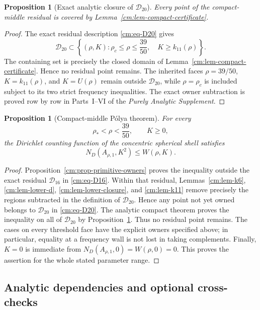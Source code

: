 \documentclass[11pt]{article}
\numberwithin{equation}{section}
\newtheorem{proposition}[theorem]{Proposition}
\theoremstyle{definition}
\theoremstyle{remark}
\begin{document}
\begin{proposition}[Exact analytic closure of \(\mathcal D_{20}\)]
\label{cm:prop-exact-closure}
Every point of the compact-middle residual is covered by
Lemma~\ref{cm:lem-compact-certificate}.
\end{proposition}

\begin{proof}
The exact residual description \eqref{cm:eq-D20} gives
\[
 \mathcal D_{20}
 \subset
 \left\{(\rho,K):
 \rho_c\leq\rho\leq\frac{39}{50},\quad
 K\geq k_{11}(\rho)\right\}.
\]
The containing set is precisely the closed domain of
Lemma~\ref{cm:lem-compact-certificate}.  Hence no residual point remains.
The inherited faces \(\rho=39/50\), \(K=k_{11}(\rho)\), and
\(K=U(\rho)\) remain outside \(\mathcal D_{20}\), while
\(\rho=\rho_c\) is included subject to its two strict frequency
inequalities.  The exact owner subtraction is proved row by row in
Parts~I--VI of the \emph{Purely Analytic Supplement}.
\end{proof}

\begin{proposition}[Compact-middle P\'olya theorem]
\label{prop:compact-middle}
For every
\[
 \rho_*<\rho<\frac{39}{50},\qquad K\geq0,
\]
the Dirichlet counting function of the concentric spherical shell satisfies
\[
 N_D(A_{\rho,1},K^2)\leq W(\rho,K).
\]
\end{proposition}

\begin{proof}
Proposition~\ref{cm:prop-primitive-owners} proves the inequality outside
the exact residual \(\mathcal D_{16}\) in \eqref{cm:eq-D16}.  Within that
residual, Lemmas~\ref{cm:lem-k6}, \ref{cm:lem-lower-d},
\ref{cm:lem-lower-closure}, and \ref{cm:lem-k11} remove precisely the regions
subtracted in the definition of \(\mathcal D_{20}\).  Hence any point not
yet owned belongs to
\(\mathcal D_{20}\) in \eqref{cm:eq-D20}.  The analytic compact theorem proves
the inequality on all of \(\mathcal D_{20}\) by
Proposition~\ref{cm:prop-exact-closure}.  Thus no residual point remains.
The cases on every threshold face have
the explicit owners specified above; in particular, equality at a
frequency wall is not lost in taking complements.  Finally, \(K=0\) is
immediate from \(N_D(A_{\rho,1},0)=W(\rho,0)=0\).  This proves the assertion for
the whole stated parameter range.
\end{proof}

\subsection{Analytic dependencies and optional cross-checks}
\label{cm:sec-certificate-protocol}
\end{document}
